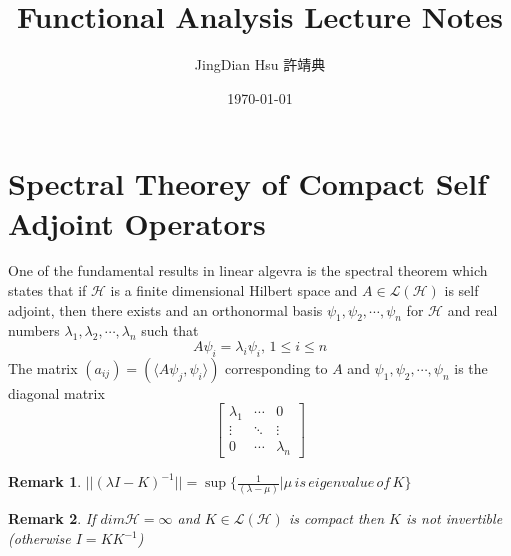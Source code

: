 \documentclass{article}
\title{Functional Analysis Lecture Notes}
\author{JingDian Hsu 許靖典}
\date\today
\newtheorem{rmk}{Remark}[section]
\newcommand{\HH}{\mathcal{H}}
\newcommand{\LL}{\mathcal{L}}
\begin{document}
\maketitle 
\clearpage

\section {Spectral Theorey of Compact Self Adjoint Operators}
\qquad One of the fundamental results in linear algevra is the spectral theorem which states that if $\HH$ is a finite dimensional Hilbert space and  $A\in \LL(\HH)$ is self adjoint, then there exists and an orthonormal basis $\psi_1, \psi_2,\cdots, \psi_n$ for $\HH$ and real numbers $\lambda_1, \lambda_2, \cdots, \lambda_n$ such that 
\[
A\psi_i=\lambda_i \psi_i,\, 1\leq i\leq n
\]
The matrix $(a_{ij})=(\langle A\psi_j,\psi_i\rangle)$ corresponding to $A$ and $\psi_1, \psi_2, \cdots, \psi_n$ is the diagonal matrix
\[
\begin{bmatrix}
	\lambda_1&\cdots&0\\
	\vdots&\ddots&\vdots\\
	0&\cdots&\lambda_n
\end{bmatrix}
\]
\begin{rmk}
	$||(\lambda I -K)^{-1}||=\sup {\{\frac{1}{(\lambda -\mu)}|\mu\, is\, eigenvalue \, of \, K \}}$
\end{rmk}
\begin{rmk}
	If $dim \HH =\infty $ and  $K\in \LL(\HH)$ is compact then $K$ is not invertible (otherwise $I=KK^{-1}$)
\end{rmk}
\end{document}
